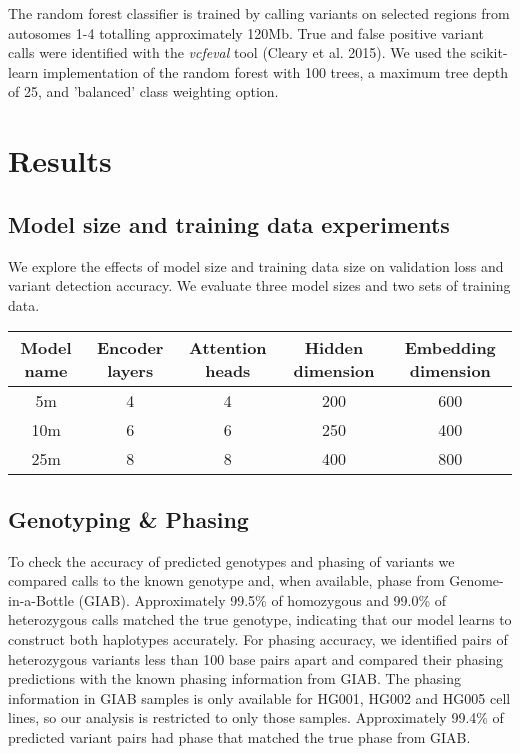 \documentclass[]{article}
\begin{document}
The random forest classifier is trained by calling variants on selected regions from autosomes 1-4 totalling approximately 120Mb. True and false positive variant calls were identified with the \textit{vcfeval} tool (Cleary et al. 2015). We used the scikit-learn implementation of the random forest with 100 trees, a maximum tree depth of 25, and 'balanced' class weighting option.  


\section{Results}

\subsection{Model size and training data experiments}

We explore the effects of model size and training data size on validation loss and variant detection accuracy. We evaluate three model sizes and two sets of training data.

\begin{center}
	\begin{tabular}{ |c|c|c|c|c| }
	 Model name & Encoder layers & Attention heads & Hidden dimension & Embedding dimension \\ 
	\hline
	 5m & 4 & 4 & 200 & 600 \\ 
	 10m & 6 & 6 & 250 & 400 \\ 
	 25m & 8 & 8 & 400 & 800 \\ 
	 \hline
	\end{tabular}
\end{center}



\subsection{Genotyping \& Phasing}

To check the accuracy of predicted genotypes and phasing of variants we compared calls to the known genotype and, when available, phase from Genome-in-a-Bottle (GIAB). Approximately 99.5\% of homozygous  and 99.0\% of heterozygous calls matched the true genotype, indicating that our model learns to construct both haplotypes accurately.  For phasing accuracy, we identified pairs of heterozygous variants less than 100 base pairs apart and compared their phasing predictions with the known phasing information from GIAB. The phasing information in GIAB samples is only available for HG001, HG002 and HG005 cell lines, so our analysis is restricted to only those samples. Approximately 99.4\% of predicted variant pairs had phase that matched the true phase from GIAB. 
\end{document}
